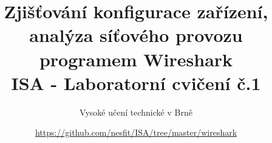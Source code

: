 \documentclass[a4paper,11pt]{article}
\title{Zjišťování konfigurace zařízení, analýza síťového provozu programem Wireshark\\
{\bf\large ISA - Laboratorní cvičení č.1}}
\author{Vysoké učení technické v Brně}
\date{\url{https://github.com/nesfit/ISA/tree/master/wireshark}}
\begin{document}
{\let\newpage\relax\maketitle}


\end{document}
